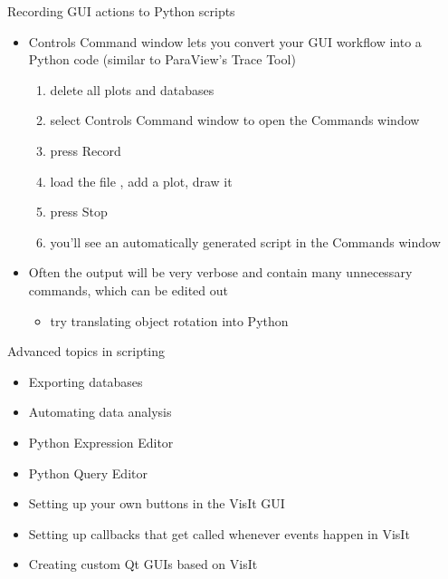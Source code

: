 \begin{frame}{Recording GUI actions to Python scripts}
  \begin{itemize}\setlength{\itemsep}{5mm}
  \item Controls \ra Command window lets you convert your GUI workflow into a Python code (similar to
    ParaView's Trace Tool)
    \begin{enumerate}\setlength{\itemsep}{1mm}
    \item delete all plots and databases
    \item select Controls \ra Command window to open the Commands window
    \item press Record
    \item load the file , add a plot, draw it
    \item press Stop
    \item you'll see an automatically generated script in the Commands window
    \end{enumerate}
  \item Often the output will be very verbose and contain many unnecessary commands, which can be edited out
    \begin{itemize}\setlength{\itemsep}{1mm}
    \item try translating object rotation into Python
    \end{itemize}
  \end{itemize}
\end{frame}

\begin{frame}{Advanced topics in scripting}
  \begin{itemize}\setlength{\itemsep}{3mm}
  \item Exporting databases
  \item Automating data analysis
  \item Python Expression Editor
  \item Python Query Editor
  \item Setting up your own buttons in the VisIt GUI
  \item Setting up callbacks that get called whenever events happen in VisIt
  \item Creating custom Qt GUIs based on VisIt
  \end{itemize}
\end{frame}
